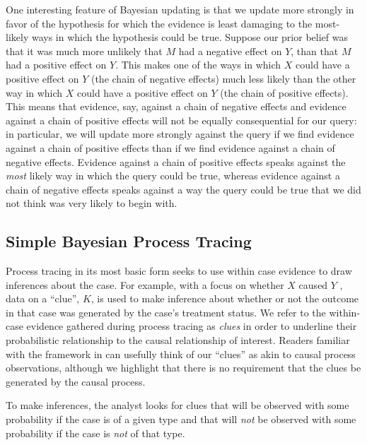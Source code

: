 \documentclass[12pt,]{book}
\begin{document}
One interesting feature of Bayesian updating is that we update more strongly in favor of the hypothesis for which the evidence is least damaging to the most-likely ways in which the hypothesis could be true. Suppose our prior belief was that it was much more unlikely that \(M\) had a negative effect on \(Y\), than that \(M\) had a positive effect on \(Y\). This makes one of the ways in which \(X\) could have a positive effect on \(Y\) (the chain of negative effects) much less likely than the other way in which \(X\) could have a positive effect on \(Y\) (the chain of positive effects). This means that evidence, say, against a chain of negative effects and evidence against a chain of positive effects will not be equally consequential for our query: in particular, we will update more strongly against the query if we find evidence against a chain of positive effects than if we find evidence against a chain of negative effects. Evidence against a chain of positive effects speaks against the \emph{most} likely way in which the query could be true, whereas evidence against a chain of negative effects speaks against a way the query could be true that we did not think was very likely to begin with.

\hypertarget{simple-bayesian-process-tracing}{%
\subsection{Simple Bayesian Process Tracing}\label{simple-bayesian-process-tracing}}

Process tracing in its most basic form seeks to use within case evidence to draw inferences about the case. For example, with a focus on whether \(X\) caused \(Y\) , data on a ``clue'', \(K\), is used to make inference about whether or not the outcome in that case was generated by the case's treatment status. We refer to the within-case evidence gathered during process tracing as \emph{clues} in order to underline their probabilistic relationship to the causal relationship of interest. Readers familiar with the framework in \citet{collier2004sources} can usefully think of our ``clues'' as akin to causal process observations, although we highlight that there is no requirement that the clues be generated by the causal process.

To make inferences, the analyst looks for clues that will be observed with some probability if the case is of a given type and that will \emph{not} be observed with some probability if the case is \emph{not} of that type.
\end{document}
